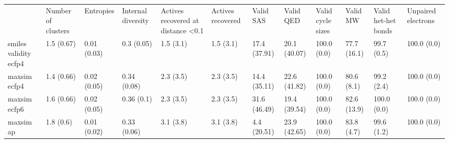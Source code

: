 \begin{tabular}{llllllllllll}
 & Number of clusters & Entropies & Internal diversity & Actives recovered at distance <0.1 & Actives recovered & Valid SAS & Valid QED & Valid cycle sizes & Valid MW & Valid het-het bonds & Unpaired electrons \\
smiles validity ecfp4 & {\cellcolor[HTML]{F5FBFC}} \color[HTML]{000000} 1.5 (0.67) & {\cellcolor[HTML]{F1FAFC}} \color[HTML]{000000} 0.01 (0.03) & {\cellcolor[HTML]{B7E4DA}} \color[HTML]{000000} 0.3 (0.05) & {\cellcolor[HTML]{F5FBFD}} \color[HTML]{000000} 1.5 (3.1) & {\cellcolor[HTML]{F5FBFD}} \color[HTML]{000000} 1.5 (3.1) & {\cellcolor[HTML]{DBF2F2}} \color[HTML]{000000} 17.4 (37.91) & {\cellcolor[HTML]{D6F0EE}} \color[HTML]{000000} 20.1 (40.07) & {\cellcolor[HTML]{00441B}} \color[HTML]{F1F1F1} 100.0 (0.0) & {\cellcolor[HTML]{1C8540}} \color[HTML]{F1F1F1} 77.7 (16.1) & {\cellcolor[HTML]{00441B}} \color[HTML]{F1F1F1} 99.7 (0.5) & {\cellcolor[HTML]{00441B}} \color[HTML]{F1F1F1} 100.0 (0.0) \\
maxsim ecfp4 & {\cellcolor[HTML]{F5FBFD}} \color[HTML]{000000} 1.4 (0.66) & {\cellcolor[HTML]{F7FCFD}} \color[HTML]{000000} 0.02 (0.05) & {\cellcolor[HTML]{A8DED2}} \color[HTML]{000000} 0.34 (0.08) & {\cellcolor[HTML]{F4FBFC}} \color[HTML]{000000} 2.3 (3.5) & {\cellcolor[HTML]{F4FBFC}} \color[HTML]{000000} 2.3 (3.5) & {\cellcolor[HTML]{E2F4F7}} \color[HTML]{000000} 14.4 (35.11) & {\cellcolor[HTML]{D1EEEA}} \color[HTML]{000000} 22.6 (41.82) & {\cellcolor[HTML]{00441B}} \color[HTML]{F1F1F1} 100.0 (0.0) & {\cellcolor[HTML]{137D39}} \color[HTML]{F1F1F1} 80.6 (8.1) & {\cellcolor[HTML]{00471C}} \color[HTML]{F1F1F1} 99.2 (2.4) & {\cellcolor[HTML]{00441B}} \color[HTML]{F1F1F1} 100.0 (0.0) \\
maxsim ecfp6 & {\cellcolor[HTML]{F4FBFC}} \color[HTML]{000000} 1.6 (0.66) & {\cellcolor[HTML]{F7FCFD}} \color[HTML]{000000} 0.02 (0.05) & {\cellcolor[HTML]{A0DBCD}} \color[HTML]{000000} 0.36 (0.1) & {\cellcolor[HTML]{F4FBFC}} \color[HTML]{000000} 2.3 (3.5) & {\cellcolor[HTML]{F4FBFC}} \color[HTML]{000000} 2.3 (3.5) & {\cellcolor[HTML]{B2E2D7}} \color[HTML]{000000} 31.6 (46.49) & {\cellcolor[HTML]{D8F0EF}} \color[HTML]{000000} 19.4 (39.54) & {\cellcolor[HTML]{00441B}} \color[HTML]{F1F1F1} 100.0 (0.0) & {\cellcolor[HTML]{0D7836}} \color[HTML]{F1F1F1} 82.6 (13.9) & {\cellcolor[HTML]{00441B}} \color[HTML]{F1F1F1} 100.0 (0.0) & {\cellcolor[HTML]{00441B}} \color[HTML]{F1F1F1} 100.0 (0.0) \\
maxsim ap & {\cellcolor[HTML]{F0F9FB}} \color[HTML]{000000} 1.8 (0.6) & {\cellcolor[HTML]{F2FAFC}} \color[HTML]{000000} 0.01 (0.02) & {\cellcolor[HTML]{ACDFD4}} \color[HTML]{000000} 0.33 (0.06) & {\cellcolor[HTML]{F3FAFC}} \color[HTML]{000000} 3.1 (3.8) & {\cellcolor[HTML]{F3FAFC}} \color[HTML]{000000} 3.1 (3.8) & {\cellcolor[HTML]{F1FAFC}} \color[HTML]{000000} 4.4 (20.51) & {\cellcolor[HTML]{CEEDE8}} \color[HTML]{000000} 23.9 (42.65) & {\cellcolor[HTML]{00441B}} \color[HTML]{F1F1F1} 100.0 (0.0) & {\cellcolor[HTML]{0A7633}} \color[HTML]{F1F1F1} 83.8 (4.7) & {\cellcolor[HTML]{00451C}} \color[HTML]{F1F1F1} 99.6 (1.2) & {\cellcolor[HTML]{00441B}} \color[HTML]{F1F1F1} 100.0 (0.0) \\

\end{tabular}
